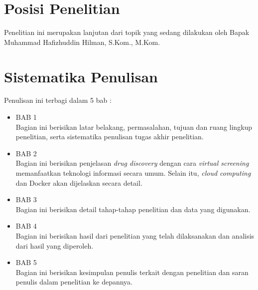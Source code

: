 \section{Posisi Penelitian}
Penelitian ini merupakan lanjutan dari topik yang sedang dilakukan oleh Bapak Muhammad Hafizhuddin Hilman, S.Kom., M.Kom. 

\section{Sistematika Penulisan}
Penulisan ini terbagi dalam 5 bab :
\begin{itemize}
	\item BAB 1 \babSatu \\
	Bagian ini berisikan latar belakang, permasalahan, tujuan dan ruang lingkup penelitian, serta sistematika penulisan tugas akhir penelitian. 
	\item BAB 2 \babDua \\
	Bagian ini berisikan penjelasan \textit{drug discovery} dengan cara \textit{virtual screening} memanfaatkan teknologi informasi secara umum. Selain itu, \textit{cloud computing} dan Docker akan dijelaskan secara detail.
	\item BAB 3 \babTiga \\
	Bagian ini berisikan detail tahap-tahap penelitian dan data yang digunakan.
	\item BAB 4 \babEmpat \\
	Bagian ini berisikan hasil dari penelitian yang telah dilaksanakan dan analisis dari hasil yang diperoleh.
	\item BAB 5 \kesimpulan \\
	Bagian ini berisikan kesimpulan penulis terkait dengan penelitian dan saran penulis dalam penelitian ke depannya.
\end{itemize}


